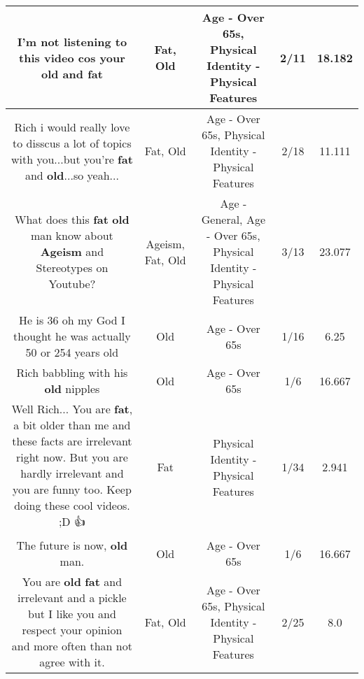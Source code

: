 \documentclass[11pt]{article}
\newlength\mylength
\begin{document}
\begin{center}
\begin{longtable}{|C{.65\mylength}|C{.30\mylength}|C{.12\mylength}|C{.12\mylength}|C{.12\mylength}|}
  \small I'm not listening to this video cos your \textbf{old} and fat\normalsize   & Fat, Old & Age - Over 65s, Physical Identity - Physical Features & 2/11 & 18.182 \\  \hline
  \small Rich i would really love to disscus a lot of topics with you...but you're \textbf{fat} and \textbf{old}...so yeah...\normalsize   & Fat, Old & Age - Over 65s, Physical Identity - Physical Features & 2/18 & 11.111 \\  \hline
  \small What does this \textbf{fat} \textbf{old} man know about \textbf{Ageism} and Stereotypes on Youtube?\normalsize   & Ageism, Fat, Old & Age - General, Age - Over 65s, Physical Identity - Physical Features & 3/13 & 23.077 \\  \hline
  \small He is 36 oh my God I thought he was actually 50 or  254 years old\normalsize   & Old & Age - Over 65s & 1/16 & 6.25 \\  \hline
  \small Rich babbling with his \textbf{old} nipples\normalsize   & Old & Age - Over 65s & 1/6 & 16.667 \\  \hline
  \small Well Rich... You are \textbf{fat}, a bit older than me and these facts are irrelevant right now. But you are hardly irrelevant and you are funny too. Keep doing these cool videos. ;D 👍\normalsize   & Fat & Physical Identity - Physical Features & 1/34 & 2.941 \\  \hline
  \small The future is now, \textbf{old} man.\normalsize   & Old & Age - Over 65s & 1/6 & 16.667 \\  \hline
  \small You are \textbf{old} \textbf{fat} and irrelevant and a pickle but I like you and respect your opinion and more often than not agree with it.\normalsize   & Fat, Old & Age - Over 65s, Physical Identity - Physical Features & 2/25 & 8.0 \\  \hline

\end{longtable}
\end{center}
\end{document}
